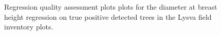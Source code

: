 \begin{figure}
\caption[Regression quality assessment plots plots for the dbh regression on true positive detected trees.]{\label{fig-lysva-regression-metrics}Regression quality
assessment plots plots for the diameter at breast height regression on
true positive detected trees in the Lysva field inventory plots.}
\end{figure}